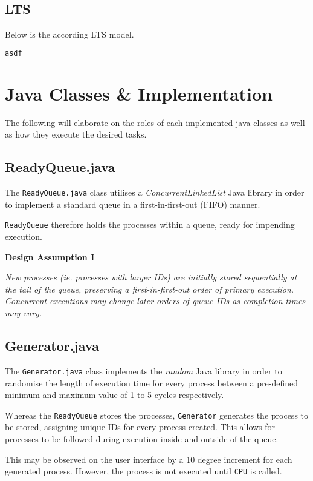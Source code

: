 \documentclass[]{report}
\begin{document}
\subsection*{LTS}
Below is the according LTS model. 
\vspace{2mm}
\begin{lstlisting}[language=Python, frame=l]
 asdf
\end{lstlisting}

\newpage 

\section*{Java Classes \& Implementation}
The following will elaborate on the roles of each implemented java classes as well as how they execute the desired tasks. 
	
\subsection*{ReadyQueue.java}
The \verb|ReadyQueue.java| class utilises a \textit{ConcurrentLinkedList} Java library in order to implement a standard queue in a first-in-first-out (FIFO) manner. \par 
\verb|ReadyQueue| therefore holds the processes within a queue, ready for impending execution.

\begin{mdframed}[backgroundcolor=lightgray!40]
	\textbf{Design Assumption I} \par 
	\textit{New processes (ie. processes with larger IDs) are initially stored sequentially at the tail of the queue, preserving a first-in-first-out order of primary execution. Concurrent executions may change later orders of queue IDs as completion times may vary.}
\end{mdframed}

\vspace{2mm}

\subsection*{Generator.java}
The \verb|Generator.java| class implements the \textit{random} Java library in order to randomise the length of execution time for every process between a pre-defined minimum and maximum value of 1 to 5 cycles respectively. \par 
Whereas the \verb|ReadyQueue| stores the processes, \verb|Generator| generates the process to be stored, assigning unique IDs for every process created. This allows for processes to be followed during execution inside and outside of the queue. \par 
This may be observed on the user interface by a 10 degree increment for each generated process. However, the process is not executed until \verb|CPU| is called.
\end{document}

